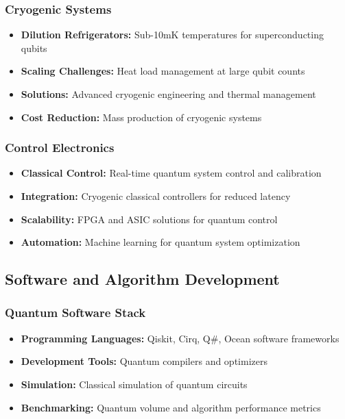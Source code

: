 \documentclass[12pt,a4paper]{article}
\begin{document}
\subsubsection{Cryogenic Systems}
\begin{itemize}
    \item \textbf{Dilution Refrigerators:} Sub-10mK temperatures for superconducting qubits
    \item \textbf{Scaling Challenges:} Heat load management at large qubit counts
    \item \textbf{Solutions:} Advanced cryogenic engineering and thermal management
    \item \textbf{Cost Reduction:} Mass production of cryogenic systems
\end{itemize}

\subsubsection{Control Electronics}
\begin{itemize}
    \item \textbf{Classical Control:} Real-time quantum system control and calibration
    \item \textbf{Integration:} Cryogenic classical controllers for reduced latency
    \item \textbf{Scalability:} FPGA and ASIC solutions for quantum control
    \item \textbf{Automation:} Machine learning for quantum system optimization
\end{itemize}

\subsection{Software and Algorithm Development}

\subsubsection{Quantum Software Stack}
\begin{itemize}
    \item \textbf{Programming Languages:} Qiskit, Cirq, Q\#, Ocean software frameworks
    \item \textbf{Development Tools:} Quantum compilers and optimizers
    \item \textbf{Simulation:} Classical simulation of quantum circuits
    \item \textbf{Benchmarking:} Quantum volume and algorithm performance metrics
\end{itemize}
\end{document}
